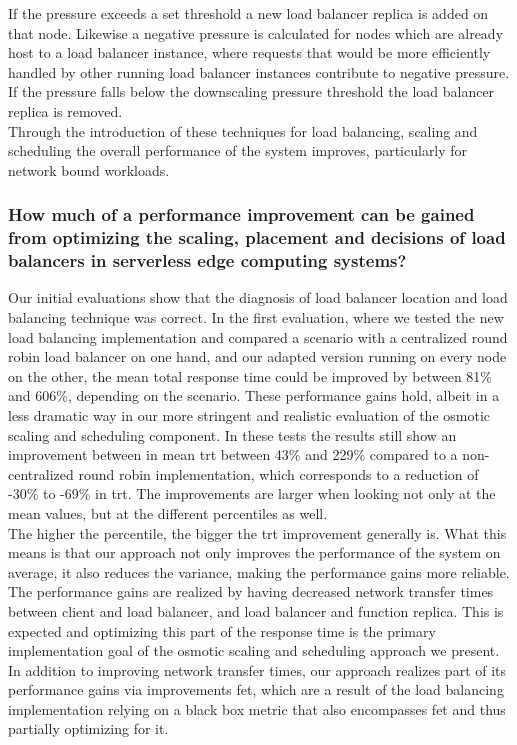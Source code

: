 If the pressure exceeds a set threshold a new load balancer replica is added on that node.
Likewise a negative pressure is calculated for nodes which are already host to a load balancer instance, where requests that would be more efficiently handled by other running load balancer instances contribute to negative pressure.
If the pressure falls below the downscaling pressure threshold the load balancer replica is removed.\\
Through the introduction of these techniques for load balancing, scaling and scheduling the overall performance of the system improves, particularly for network bound workloads.


\subsubsection{How much of a performance improvement can be gained from optimizing the scaling, placement and decisions of load balancers in serverless edge computing systems?}

Our initial evaluations show that the diagnosis of load balancer location and load balancing technique was correct.
In the first evaluation, where we tested the new load balancing implementation and compared a scenario with a centralized round robin load balancer on one hand, and our adapted version running on every node on the other, the mean total response time could be improved by between 81\% and 606\%, depending on the scenario.
These performance gains hold, albeit in a less dramatic way in our more stringent and realistic evaluation of the osmotic scaling and scheduling component.
In these tests the results still show an improvement between in mean \gls{trt} between 43\% and 229\% compared to a non-centralized round robin implementation, which corresponds to a reduction of -30\% to -69\% in \gls{trt}.
The improvements are larger when looking not only at the mean values, but at the different percentiles as well.\\
The higher the percentile, the bigger the \gls{trt} improvement generally is.
What this means is that our approach not only improves the performance of the system on average, it also reduces the variance, making the performance gains more reliable.
The performance gains are realized by having decreased network transfer times between client and load balancer, and load balancer and function replica.
This is expected and optimizing this part of the response time is the primary implementation goal of the osmotic scaling and scheduling approach we present.
In addition to improving network transfer times, our approach realizes part of its performance gains via improvements \gls{fet}, which are a result of the load balancing implementation relying on a black box metric that also encompasses \gls{fet} and thus partially optimizing for it.

